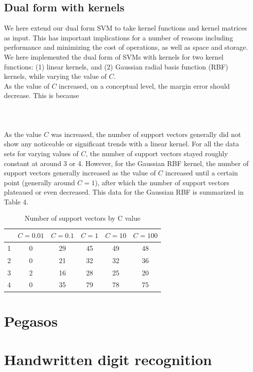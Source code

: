 \documentclass{article}
\begin{document}
\subsection{Dual form with kernels}
We here extend our dual form SVM to take kernel functions and kernel matrices as input. This has important implications for a number of reasons including performance and minimizing the cost of operations, as well as space and storage. We here implemented the dual form of SVMs with kernels for two kernel functions: (1) linear kernels, and (2) Gaussian radial basis function (RBF) kernels, while varying the value of $C$. \\

As the value of $C$ increased, on a conceptual level, the margin error should decrease. This is because \\ \\ \\ \\

As the value $C$ was increased, the number of support vectors generally did not show any noticeable or significant trends with a linear kernel. For all the data sets for varying values of $C$, the number of support vectors stayed roughly constant at around 3 or 4. However, for the Gaussian RBF kernel, the number of support vectors generally increased as the value of $C$ increased until a certain point (generally around $C=1$), after which the number of support vectors plateaued or even decreased. This data for the Gaussian RBF is summarized in Table 4.

\begin{table}
  \begin{center}
    \begin{tabular}{ | c | c | c | c | c | c | }
      \hline
              & $C=0.01$ & $C=0.1$ & $C=1$ & $C=10$ & $C=100$ \\ \hline
      1       & 0        & 29      & 45    & 49     & 48      \\ \hline
      2       & 0        & 21      & 32    & 32     & 36      \\ \hline
      3       & 2        & 16      & 28    & 25     & 20      \\ \hline
      4       & 0        & 35      & 79    & 78     & 75      \\ \hline
    \end{tabular}
  \end{center}
  \caption{Number of support vectors by C value}
\end{table}

\section{Pegasos}

\section{Handwritten digit recognition}
\end{document}
